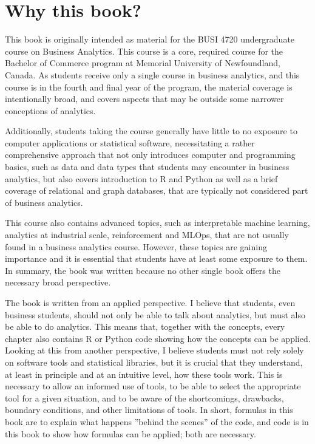 %
%
\section*{Why this book?}

This book is originally intended as material for the BUSI 4720 undergraduate course on Business Analytics. This course is a core, required course for the Bachelor of Commerce program at Memorial University of Newfoundland, Canada. As students receive only a single course in business analytics, and this course is in the fourth and final year of the program, the material coverage is intentionally broad, and covers aspects that may be outside some narrower conceptions of analytics. 
\begin{withcode}
Additionally, students taking the course generally have little to no exposure to computer applications or statistical software, necessitating a rather comprehensive approach that not only introduces computer and programming basics, such as data and data types that students may encounter in business analytics, but also covers introduction to R and Python as well as a brief coverage of relational and graph databases, that are typically not considered part of business analytics. 
\end{withcode}
This course also contains advanced topics, such as interpretable machine learning, analytics at industrial scale, reinforcement and MLOps, that are not usually found in a business analytics course. However, these topics are gaining importance and it is essential that students have at least some exposure to them. In summary, the book was written because no other single book offers the necessary broad perspective. 

\begin{withcode}
The book is written from an applied perspective. I believe that students, even business students, should not only be able to talk about analytics, but must also be able to do analytics. This means that, together with the concepts, every chapter also contains R or Python code showing how the concepts can be applied. Looking at this from another perspective, I believe students must not rely solely on software tools and statistical libraries, but it is crucial that they understand, at least in principle and at an intuitive level, how these tools work. This is necessary to allow an informed use of tools, to be able to select the appropriate tool for a given situation, and to be aware of the shortcomings, drawbacks, boundary conditions, and other limitations of tools. In short, formulas in this book are to explain what happens ''behind the scenes'' of the code, and code is in this book to show how formulas can be applied; both are necessary.
\end{withcode}

